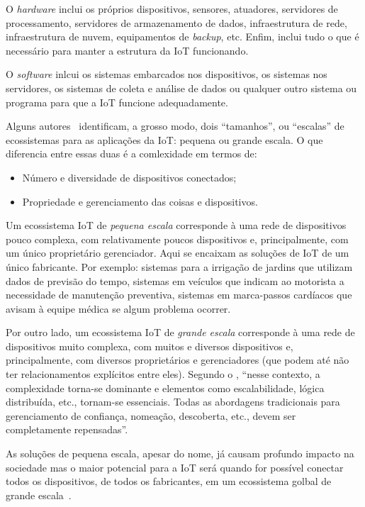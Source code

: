 \documentclass[pdftex, brazil, 12pt, twoside]{article}
\newcommand{\ingles}[1]{\textit{#1}}
\begin{document}
O \ingles{hardware} inclui os próprios dispositivos, sensores, atuadores,
servidores de processamento, servidores de armazenamento de dados,
infraestrutura de rede, infraestrutura de nuvem, equipamentos de \ingles{backup}, etc.
Enfim, inclui tudo o que é necessário para manter a estrutura da IoT funcionando.

O \ingles{software} inlcui os sistemas embarcados nos dispositivos, os sistemas
nos servidores, os sistemas de coleta e análise de dados ou qualquer outro
sistema ou programa para que a IoT funcione adequadamente.

Alguns autores~\citep{UKGOSWalportIoT2014,IEEEIoTDefinition,BarbozaTCCIoT2015}
identificam, a grosso modo, dois ``tamanhos'', ou ``escalas'' de ecossistemas
para as aplicações da IoT: pequena ou grande escala.
O que diferencia entre essas duas é a comlexidade em termos de:

\begin{itemize}[noitemsep]
\item Número e diversidade de dispositivos conectados;
\item Propriedade e gerenciamento das coisas e dispositivos.
\end{itemize}

Um ecossistema IoT de \emph{pequena escala} corresponde à uma rede de dispositivos
pouco complexa, com relativamente poucos dispositivos e, principalmente, com
um único proprietário gerenciador. Aqui se encaixam as soluções
de IoT de um único fabricante. Por exemplo: sistemas para a irrigação de jardins
que utilizam dados de previsão do tempo, sistemas em veículos que indicam ao
motorista a necessidade de manutenção preventiva, sistemas em marca-passos cardíacos
que avisam à equipe médica se algum problema ocorrer.

Por outro lado, um ecossistema IoT de \emph{grande escala} corresponde à uma rede
de dispositivos muito complexa, com muitos e diversos dispositivos e, principalmente, com
diversos proprietários e gerenciadores (que podem até não ter relacionamentos
explícitos entre eles). Segundo o \citet[][p.\ 75]{IEEEIoTDefinition}, ``nesse contexto,
a complexidade torna-se dominante e elementos como escalabilidade, lógica distribuída,
etc., tornam-se essenciais. Todas as abordagens tradicionais para gerenciamento
de confiança, nomeação, descoberta, etc., devem ser completamente repensadas''.

As soluções de pequena escala, apesar do nome, já causam profundo impacto na sociedade
mas o maior potencial para a IoT será quando for possível conectar todos os dispositivos,
de todos os fabricantes, em um ecossistema golbal de grande escala~\citep{UKGOSWalportIoT2014,IEEEIoTDefinition,BhattIoT,IEEEIoTReport,McKinseyIoTHype,MoolayilIoT2016,RajIoT2017,OliverWymanIoT2015,SAPFutureIoT,CiscoIoEPublicSectorOpportunity,CiscoIoTFAQ2013,CiscoIoTVS2013,CiscoIoEPublicSectorEconomicAnalysis,CiscoIoESurvey2013,CiscoIoEValuePrivate2013,CiscoIoEValuePublic2013}.
\end{document}
